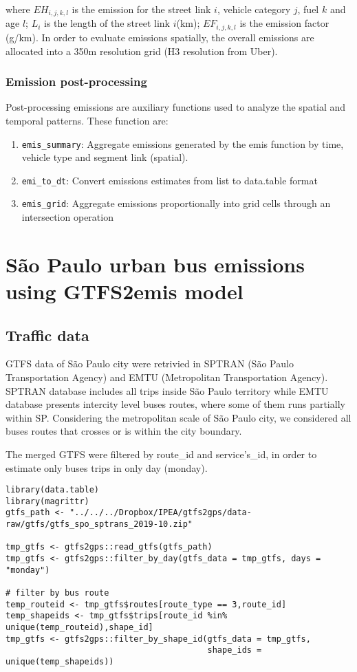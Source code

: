 \documentclass[gc, manuscript]{copernicus}
\begin{document}
where \(EH_{i,j,k,l}\) is the emission for the street link \(i\),
vehicle category \(j\), fuel \(k\) and age \(l\); \(L_i\) is the length
of the street link \(i\)(km); \(EF_{i,j,k,l}\) is the emission factor
(g/km). In order to evaluate emissions spatially, the overall emissions
are allocated into a 350m resolution grid (H3 resolution from Uber).

\subsubsection{Emission post-processing}

Post-processing emissions are auxiliary functions used to analyze the
spatial and temporal patterns. These function are:

\begin{enumerate}
\item \texttt{emis\_summary}: Aggregate emissions generated by the emis function by time,
vehicle type and segment link (spatial).
\item \texttt{emi\_to\_dt}: Convert emissions estimates from list to data.table format
\item \texttt{emis\_grid}: Aggregate emissions proportionally into grid cells through an intersection operation
\end{enumerate}

\section{São Paulo urban bus emissions using GTFS2emis model}

\subsection{Traffic data}

GTFS data of São Paulo city were retrivied in SPTRAN (São Paulo
Transportation Agency) and EMTU (Metropolitan Transportation Agency).
SPTRAN database includes all trips inside São Paulo territory while EMTU
database presents intercity level buses routes, where some of them runs
partially within SP. Considering the metropolitan scale of São Paulo
city, we considered all buses routes that crosses or is within the city
boundary.

The merged GTFS were filtered by route\_id and service's\_id, in order
to estimate only buses trips in only day (monday).

\begin{verbatim}
library(data.table)
library(magrittr)
gtfs_path <- "../../../Dropbox/IPEA/gtfs2gps/data-raw/gtfs/gtfs_spo_sptrans_2019-10.zip"

tmp_gtfs <- gtfs2gps::read_gtfs(gtfs_path)
tmp_gtfs <- gtfs2gps::filter_by_day(gtfs_data = tmp_gtfs, days = "monday")

# filter by bus route
temp_routeid <- tmp_gtfs$routes[route_type == 3,route_id]
temp_shapeids <- tmp_gtfs$trips[route_id %in% unique(temp_routeid),shape_id]
tmp_gtfs <- gtfs2gps::filter_by_shape_id(gtfs_data = tmp_gtfs,
                                         shape_ids = unique(temp_shapeids))
\end{verbatim}
\end{document}
